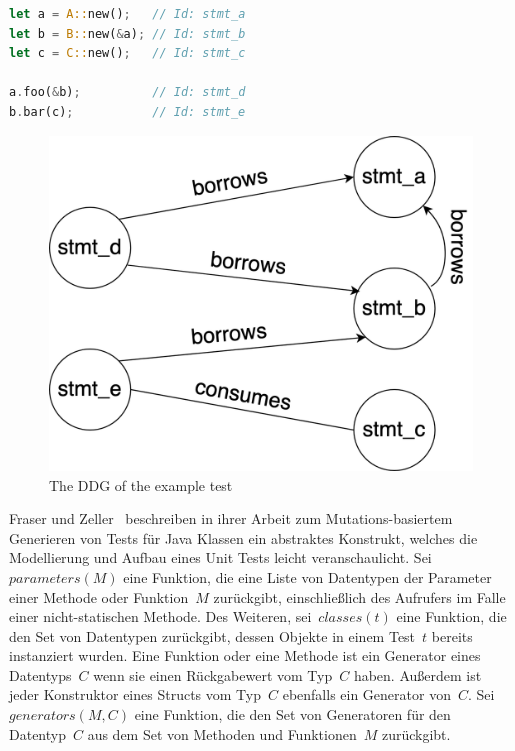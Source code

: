 \documentclass{article}
\begin{document}
\begin{minipage}{0.45\textwidth}
\begin{lstlisting}[language=Rust, style=boxed, caption=An example test, label=lst:example-test]
let a = A::new();   // Id: stmt_a
let b = B::new(&a); // Id: stmt_b
let c = C::new();   // Id: stmt_c

a.foo(&b);          // Id: stmt_d
b.bar(c);           // Id: stmt_e
\end{lstlisting}
\end{minipage}%
\hfill
\begin{minipage}{0.45\textwidth}
\begin{figure}[H]
  \caption{The DDG of the example test}

  \includegraphics[width=\linewidth]{ddg-expose}
\end{figure}
\end{minipage}%

Fraser und Zeller~\cite{Fraser2012} beschreiben in ihrer Arbeit zum Mutations-basiertem Generieren von Tests für Java Klassen ein abstraktes Konstrukt, welches die Modellierung und Aufbau eines Unit Tests leicht veranschaulicht. Sei~$parameters(M)$ eine Funktion, die eine Liste von Datentypen der Parameter einer Methode oder Funktion~$M$ zurückgibt, einschließlich des Aufrufers im Falle einer nicht-statischen Methode. Des Weiteren, sei~$classes(t)$ eine Funktion, die den Set von Datentypen zurückgibt, dessen Objekte in einem Test~$t$ bereits instanziert wurden. Eine Funktion oder eine Methode ist ein Generator eines Datentyps~$C$ wenn sie einen Rückgabewert vom Typ~$C$ haben. Außerdem ist jeder Konstruktor eines Structs vom Typ~$C$ ebenfalls ein Generator von~$C$. Sei~$generators(M,C)$ eine Funktion, die den Set von Generatoren für den Datentyp~$C$ aus dem Set von Methoden und Funktionen~$M$ zurückgibt. 
\end{document}
